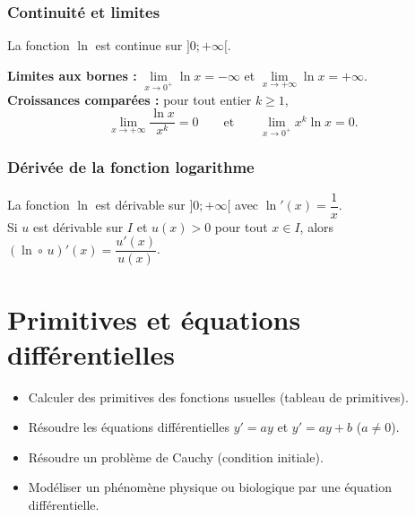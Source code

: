 \documentclass[11pt,a4paper,openany]{book}
\theoremstyle{definition}
\newcommand{\nchap}{
    \setcounter{Définition}{0}
    \setcounter{Propriété}{0}
    \setcounter{Théorème}{0}
    \setcounter{Remarque}{0}
    \setcounter{Exemple}{0}
}
\begin{document}
    \subsection{Continuité et limites}
    \begin{Propriété}
        La fonction $\ln$ est continue sur $]0;+\infty[$.
    \end{Propriété}

    \begin{Propriété}
        \textbf{Limites aux bornes :}
        $\lim\limits_{x\to 0^+}\ln x=-\infty$ et
        $\lim\limits_{x\to+\infty}\ln x=+\infty$.\\[4pt]
        \textbf{Croissances comparées :} pour tout entier $k\geq 1$,
        \[
            \lim\limits_{x\to+\infty}\frac{\ln x}{x^k}=0
            \qquad\text{et}\qquad
            \lim\limits_{x\to 0^+}x^k\ln x=0.
        \]
    \end{Propriété}

    \subsection{Dérivée de la fonction logarithme}
    \begin{Propriété}
        La fonction $\ln$ est dérivable sur $]0;+\infty[$ avec $\ln'(x)=\dfrac{1}{x}$.\\
        Si $u$ est dérivable sur $I$ et $u(x)>0$ pour tout $x\in I$, alors
        $(\ln\circ\, u)'(x)=\dfrac{u'(x)}{u(x)}$.
    \end{Propriété}

    \chapter{Primitives et équations différentielles}
    \nchap

    \begin{capacitesbox}
    \begin{itemize}
        \item Calculer des primitives des fonctions usuelles (tableau de primitives).
        \item Résoudre les équations différentielles $y'=ay$ et $y'=ay+b$ ($a\neq 0$).
        \item Résoudre un problème de Cauchy (condition initiale).
        \item Modéliser un phénomène physique ou biologique par une équation différentielle.
    \end{itemize}
    \end{capacitesbox}
\end{document}
